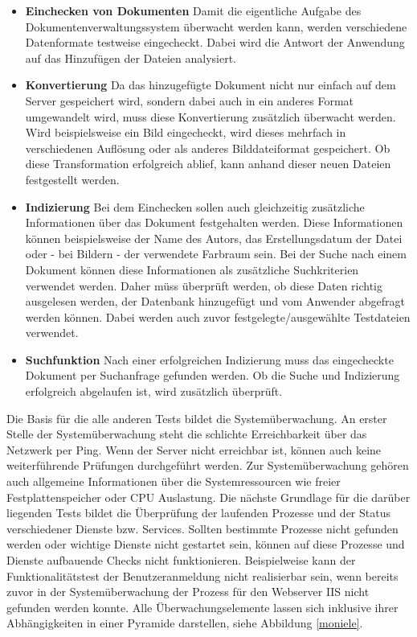 \begin{itemize}

\item \textbf{Einchecken von Dokumenten} Damit die eigentliche Aufgabe des Dokumentenverwaltungssystem überwacht werden kann, werden verschiedene Datenformate testweise eingecheckt. 
Dabei wird die Antwort der Anwendung auf das Hinzufügen der Dateien analysiert.

\item \textbf{Konvertierung} Da das hinzugefügte Dokument nicht nur einfach auf dem Server gespeichert wird, sondern dabei auch in ein anderes Format umgewandelt wird, muss diese Konvertierung zusätzlich überwacht werden. 
Wird beispielsweise ein Bild eingecheckt, wird dieses mehrfach in verschiedenen Auflösung oder als anderes Bilddateiformat gespeichert. 
Ob diese Transformation erfolgreich ablief, kann anhand dieser neuen Dateien festgestellt werden.

\item \textbf{Indizierung} Bei dem Einchecken sollen auch gleichzeitig zusätzliche Informationen über das Dokument festgehalten werden. 
Diese Informationen können beispielsweise der Name des Autors, das Erstellungsdatum der Datei oder - bei Bildern - der verwendete Farbraum sein. 
Bei der Suche nach einem Dokument können diese Informationen als zusätzliche Suchkriterien verwendet werden.
Daher müss überprüft werden, ob diese Daten richtig ausgelesen werden, der Datenbank hinzugefügt und vom Anwender abgefragt werden können. Dabei werden auch zuvor festgelegte/ausgewählte Testdateien verwendet.

\item \textbf{Suchfunktion} Nach einer erfolgreichen Indizierung muss das eingecheckte Dokument per Suchanfrage gefunden werden.
Ob die Suche und Indizierung erfolgreich abgelaufen ist, wird zusätzlich überprüft. 
\end{itemize}
Die Basis für die alle anderen Tests bildet die Systemüberwachung.
An erster Stelle der Systemüberwachung steht die schlichte Erreichbarkeit über das Netzwerk per Ping.
Wenn der Server nicht erreichbar ist, können auch keine weiterführende Prüfungen durchgeführt werden.
Zur Systemüberwachung gehören auch allgemeine Informationen über die Systemressourcen wie freier Festplattenspeicher oder CPU Auslastung.
Die nächste Grundlage für die darüber liegenden Tests bildet die Überprüfung der laufenden Prozesse und der Status verschiedener Dienste bzw. Services.
Sollten bestimmte Prozesse nicht gefunden werden oder wichtige Dienste nicht gestartet sein, können auf diese Prozesse und Dienste aufbauende Checks nicht funktionieren.
Beispielweise kann der Funktionalitätstest der Benutzeranmeldung nicht realisierbar sein, wenn bereits zuvor in der Systemüberwachung der Prozess für den Webserver \gls{IIS} nicht gefunden werden konnte.
Alle Überwachungselemente lassen sich inklusive ihrer Abhängigkeiten in einer Pyramide darstellen, siehe Abbildung \ref{moniele}.

